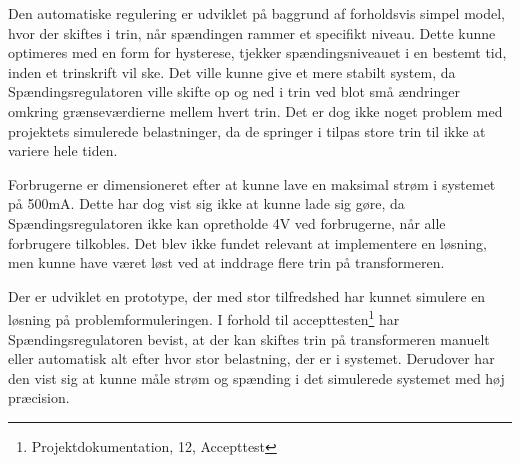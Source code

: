 
Den automatiske regulering er udviklet på baggrund af forholdsvis simpel model, hvor der skiftes i trin, når spændingen rammer et specifikt niveau. Dette kunne optimeres med en form for hysterese, tjekker spændingsniveauet i en bestemt tid, inden et trinskrift vil ske. Det ville kunne give et mere stabilt system, da Spændingsregulatoren ville skifte op og ned i trin ved blot små ændringer omkring grænseværdierne mellem hvert trin. Det er dog ikke noget problem med projektets simulerede belastninger, da de springer i tilpas store trin til ikke at variere hele tiden.

Forbrugerne er dimensioneret efter at kunne lave en maksimal strøm i systemet på 500mA. Dette har dog vist sig ikke at kunne lade sig gøre, da Spændingsregulatoren ikke kan opretholde 4V ved forbrugerne, når alle forbrugere tilkobles. Det blev ikke fundet relevant at implementere en løsning, men kunne have været løst ved at inddrage flere trin på transformeren.

Der er udviklet en prototype, der med stor tilfredshed har kunnet simulere en løsning på problemformuleringen. I forhold til accepttesten\footnote{Projektdokumentation, 12, Accepttest} har Spændingsregulatoren bevist, at der kan skiftes trin på transformeren manuelt eller automatisk alt efter hvor stor belastning, der er i systemet. Derudover har den vist sig at kunne måle strøm og spænding i det simulerede systemet med høj præcision.